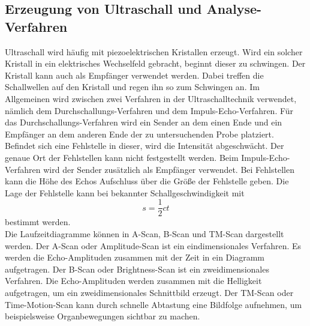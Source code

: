 \subsection{Erzeugung von Ultraschall und Analyse-Verfahren}
Ultraschall wird häufig mit piezoelektrischen Kristallen erzeugt.
Wird ein solcher Kristall in ein elektrisches Wechselfeld gebracht, beginnt dieser zu schwingen.
Der Kristall kann auch als Empfänger verwendet werden. Dabei treffen die Schallwellen auf den Kristall und regen ihn so zum Schwingen an.
Im Allgemeinen wird zwischen zwei Verfahren in der Ultraschalltechnik verwendet, nämlich dem Durchschallungs-Verfahren und dem Impuls-Echo-Verfahren.
Für das Durchschallungs-Verfahren wird ein Sender an dem einen Ende und ein Empfänger an dem anderen Ende der zu untersuchenden Probe platziert.
Befindet sich eine Fehlstelle in dieser, wird die Intensität abgeschwächt.
Der genaue Ort der Fehlstellen kann nicht festgestellt werden.
Beim Impuls-Echo-Verfahren wird der Sender zusätzlich als Empfänger verwendet.
Bei Fehlstellen kann die Höhe des Echos Aufschluss über die Größe der Fehlstelle geben.
Die Lage der Fehlstelle kann bei bekannter Schallgeschwindigkeit mit
\begin{equation}
  \label{eq:schall}
  s= \frac{1}{2}ct
\end{equation}
bestimmt werden.
\\Die Laufzeitdiagramme können in A-Scan, B-Scan und TM-Scan dargestellt werden.
Der A-Scan oder Amplitude-Scan ist ein eindimensionales Verfahren.
Es werden die Echo-Amplituden zusammen mit der Zeit in ein Diagramm aufgetragen.
Der B-Scan oder Brightness-Scan ist ein zweidimensionales Verfahren.
Die Echo-Amplituden werden zusammen mit die Helligkeit aufgetragen, um ein zweidimensionales Schnittbild erzeugt.
Der TM-Scan oder Time-Motion-Scan kann durch schnelle Abtastung eine Bildfolge aufnehmen, um beispielsweise Organbewegungen sichtbar zu machen.
